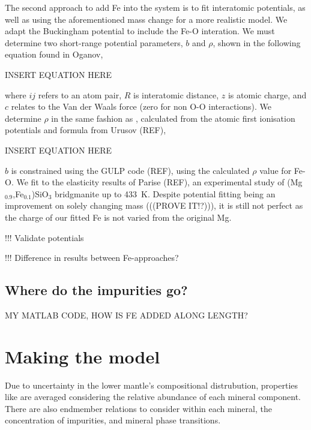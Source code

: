 The second approach to add Fe into the \mgsios system is to fit interatomic potentials, as well as using the aforementioned mass change for a more realistic model. We adapt the \citet{Oganov2008} \mgsios Buckingham potential to include the Fe-O interation. We must determine two short-range potential parameters, $b$ and $\rho$, shown in the following equation found in Oganov,

INSERT EQUATION HERE

where $ij$ refers to an atom pair, $R$ is interatomic distance, $z$ is atomic charge, and $c$ relates to the Van der Waals force (zero for non O-O interactions). We determine $\rho$ in the same fashion as \citet{Oganov2008}, calculated from the atomic first ionisation potentials and formula from Urusov (REF),

INSERT EQUATION HERE

$b$ is constrained using the GULP code (REF), using the calculated $\rho$ value for Fe-O. We fit to the elasticity results of Parise (REF), an experimental study of (Mg$_{0.9}$,Fe$_{0.1}$)SiO$_3$ bridgmanite up to 433~K. Despite potential fitting being an improvement on solely changing mass (((PROVE IT!?))), it is still not perfect as the charge of our fitted Fe is not varied from the original Mg.

!!! Validate potentials

!!! Difference in results between Fe-approaches?



\subsection{Where do the impurities go?} 

MY MATLAB CODE, HOW IS FE ADDED ALONG LENGTH?


\section{Making the model}

Due to uncertainty in the lower mantle's compositional distrubution, properties like \tcs are averaged considering the relative abundance of each mineral component. There are also endmember relations to consider within each mineral, the concentration of impurities, and mineral phase transitions.  

